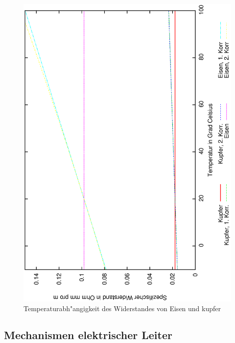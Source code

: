 \begin{figure}
   \centering
   \includegraphics[angle=-90,width=\textwidth]{bilder/spez_widerst}
   \caption{Temperaturabh"angigkeit des Widerstandes von Eisen und kupfer}
   \label{abb_spez_widerst_temp}
\end{figure}












\subsection{Mechanismen elektrischer Leiter}
\label{kap_mechanismen-elektrischer-leiter}

